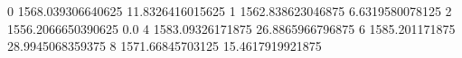 0 1568.039306640625 11.8326416015625
1 1562.838623046875 6.6319580078125
2 1556.2066650390625 0.0
4 1583.09326171875 26.8865966796875
6 1585.201171875 28.9945068359375
8 1571.66845703125 15.4617919921875
